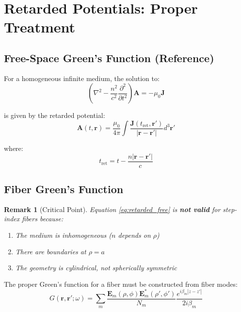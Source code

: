 \documentclass[12pt,a4paper]{article}
\newtheorem{remark}{Remark}
\begin{document}
\section{Retarded Potentials: Proper Treatment}

\subsection{Free-Space Green's Function (Reference)}

For a homogeneous infinite medium, the solution to:
\begin{equation}
\left(\nabla^2 - \frac{n^2}{c^2}\frac{\partial^2}{\partial t^2}\right) \mathbf{A} = -\mu_0 \mathbf{J}
\end{equation}

is given by the retarded potential:
\begin{equation}
\mathbf{A}(t, \mathbf{r}) = \frac{\mu_0}{4\pi} \int \frac{\mathbf{J}(t_{\text{ret}}, \mathbf{r}')}{|\mathbf{r} - \mathbf{r}'|} d^3\mathbf{r}' \label{eq:retarded_free}
\end{equation}

where:
\begin{equation}
t_{\text{ret}} = t - \frac{n|\mathbf{r} - \mathbf{r}'|}{c}
\end{equation}

\subsection{Fiber Green's Function}

\begin{remark}[Critical Point]
Equation \eqref{eq:retarded_free} is \textbf{not valid} for step-index fibers because:
\begin{enumerate}
\item The medium is \textit{inhomogeneous} ($n$ depends on $\rho$)
\item There are \textit{boundaries} at $\rho = a$
\item The geometry is \textit{cylindrical}, not spherically symmetric
\end{enumerate}
\end{remark}

The proper Green's function for a fiber must be constructed from fiber modes:
\begin{equation}
G(\mathbf{r}, \mathbf{r}'; \omega) = \sum_{m} \frac{\mathbf{E}_m(\rho, \phi) \mathbf{E}_m^*(\rho', \phi')}{N_m} \frac{e^{i\beta_m |z - z'|}}{2i\beta_m} \label{eq:fiber_greens}
\end{equation}
\end{document}
